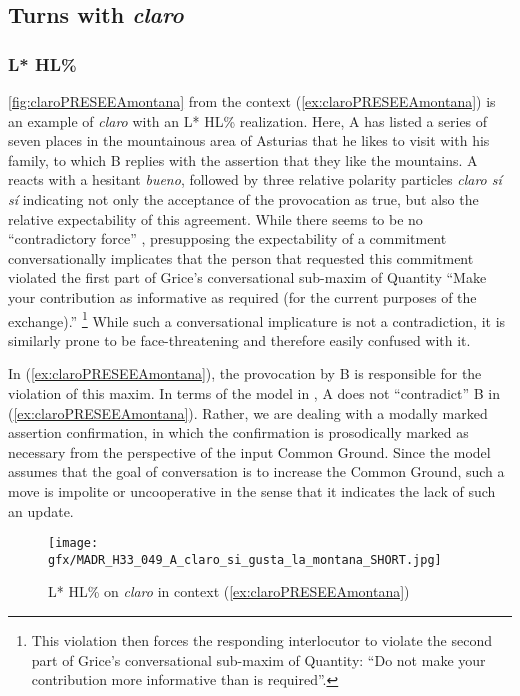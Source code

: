 \subsection{Turns with \textit{claro}}
\label{ch:5.2.1}

\subsubsection{L* HL\%}

\autoref{fig:claroPRESEEAmontana} from the context (\ref{ex:claroPRESEEAmontana}) is an example of \textit{claro} with an L* HL\% realization. Here, A has listed a series of seven places in the mountainous area of Asturias that he likes to visit with his family, to which B replies with the assertion that they like the mountains. A reacts with a hesitant \textit{bueno}, followed by three relative polarity particles \textit{claro sí sí} indicating not only the acceptance of the provocation as true, but also the relative expectability of this agreement. While there seems to be no ``contradictory force'' \citep[369]{HualdePrieto2015}, presupposing the expectability of a commitment conversationally implicates that the person that requested this commitment violated the first part of Grice's conversational sub-maxim of Quantity ``Make your contribution as informative as required (for the current purposes of the exchange).'' \citep[45]{Grice.1975}\footnote{This violation then forces the responding interlocutor to violate the second part of Grice's conversational sub-maxim of Quantity: ``Do not make your contribution more informative than is required''.} While such a conversational implicature is not a contradiction, it is similarly prone to be face-threatening and therefore easily confused with it. 

In (\ref{ex:claroPRESEEAmontana}), the provocation by B is responsible for the violation of this maxim. In terms of the model in , A does not ``contradict'' B in (\ref{ex:claroPRESEEAmontana}). Rather, we are dealing with a modally marked assertion confirmation, in which the confirmation is prosodically marked as necessary from the perspective of the input Common Ground. Since the model assumes that the goal of conversation is to increase the Common Ground, such a move is impolite or uncooperative in the sense that it indicates the lack of such an update.

\vfill
\begin{figure}[H]
	\texttt{[image: gfx/MADR\_H33\_049\_A\_claro\_si\_gusta\_la\_montana\_SHORT.jpg]}
	\caption[L* HL\% on \textit{claro} in context (\ref{ex:claroPRESEEAmontana})]{L* HL\% on \textit{claro} in context (\ref{ex:claroPRESEEAmontana}) \href{https://osf.io/uv86f/}{\faVolumeUp} \label{fig:claroPRESEEAmontana}}
\end{figure}
\vfill\pagebreak

